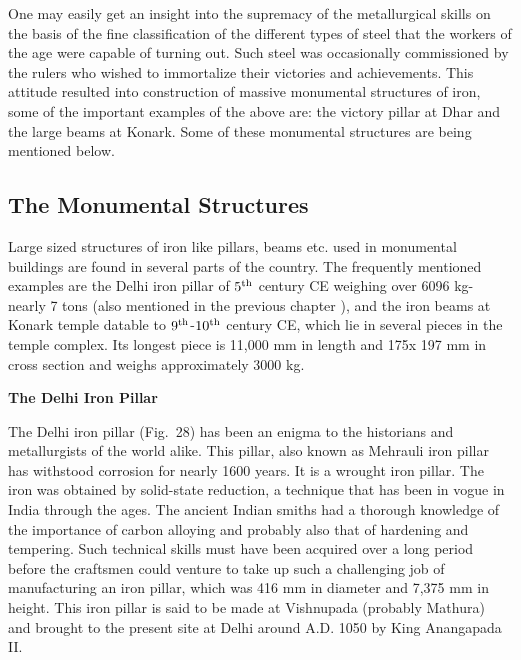 One may easily get an insight into the supremacy of the metallurgical skills on the basis of the fine classification of the different types of steel that the workers of the age were capable of turning out. Such steel was occasionally commissioned by the rulers who wished to immortalize their victories and achievements. This attitude resulted into construction of massive monumental structures of iron, some of the important examples of the above are: the victory pillar at Dhar and the large beams at Konark. Some of these monumental structures are being mentioned below.	

\vspace{-.3cm}

\subsection*{The Monumental Structures}\label{chapter5-subsection-1}

\vspace{-.2cm}

Large sized structures of iron like pillars, beams etc. used in monumental buildings are found in several parts of the country. The frequently mentioned examples are the Delhi iron pillar of $5^{\rm th}$ century CE weighing over 6096 kg- nearly 7 tons (also mentioned in the previous chapter ), and the iron beams at Konark temple datable to $9^{\rm th}$-$10^{\rm th}$ century CE, which lie in several pieces in the temple complex. Its longest piece is 11,000 mm in length and 175x 197 mm in cross section and weighs approximately 3000 kg.
\newpage

\noindent \textbf{\large The Delhi Iron Pillar}

The Delhi iron pillar (Fig.~28) has been an enigma to the historians and metallurgists of the world alike. This pillar, also known as Mehrauli iron pillar has withstood corrosion for nearly 1600 years. It is a wrought iron pillar. The iron was obtained by solid-state reduction, a technique that has been in vogue in India through the ages. The ancient Indian smiths had a thorough knowledge of the importance of carbon alloying and probably also that of hardening and tempering. Such technical skills must have been acquired over a long period before the craftsmen could venture to take up such a challenging job of manufacturing an iron pillar, which was 416 mm in diameter and 7,375 mm in height. This iron pillar is said to be made at Vishnupada (probably Mathura) and brought to the present site at Delhi around A.D. 1050 by King Anangapada II.

